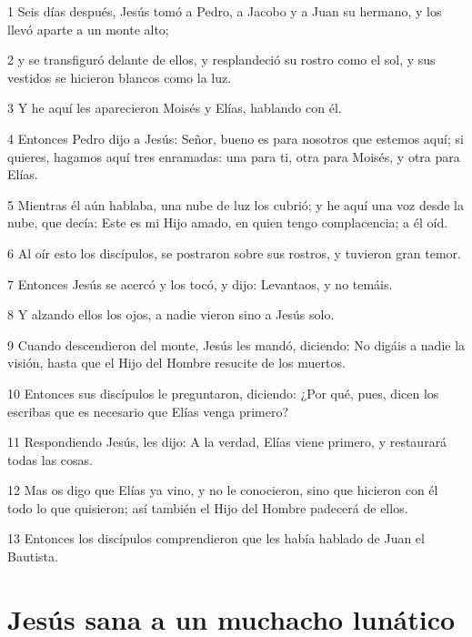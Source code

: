 \par 1 Seis días después, Jesús tomó a Pedro, a Jacobo y a Juan su hermano, y los llevó aparte a un monte alto;
\par 2 y se transfiguró delante de ellos, y resplandeció su rostro como el sol, y sus vestidos se hicieron blancos como la luz.
\par 3 Y he aquí les aparecieron Moisés y Elías, hablando con él.
\par 4 Entonces Pedro dijo a Jesús: Señor, bueno es para nosotros que estemos aquí; si quieres, hagamos aquí tres enramadas: una para ti, otra para Moisés, y otra para Elías.
\par 5 Mientras él aún hablaba, una nube de luz los cubrió; y he aquí una voz desde la nube, que decía: Este es mi Hijo amado, en quien tengo complacencia; a él oíd.
\par 6 Al oír esto los discípulos, se postraron sobre sus rostros, y tuvieron gran temor.
\par 7 Entonces Jesús se acercó y los tocó, y dijo: Levantaos, y no temáis.
\par 8 Y alzando ellos los ojos, a nadie vieron sino a Jesús solo.
\par 9 Cuando descendieron del monte, Jesús les mandó, diciendo: No digáis a nadie la visión, hasta que el Hijo del Hombre resucite de los muertos.
\par 10 Entonces sus discípulos le preguntaron, diciendo: ¿Por qué, pues, dicen los escribas que es necesario que Elías venga primero?
\par 11 Respondiendo Jesús, les dijo: A la verdad, Elías viene primero, y restaurará todas las cosas.
\par 12 Mas os digo que Elías ya vino, y no le conocieron, sino que hicieron con él todo lo que quisieron; así también el Hijo del Hombre padecerá de ellos.
\par 13 Entonces los discípulos comprendieron que les había hablado de Juan el Bautista.

\section*{Jesús sana a un muchacho lunático}

